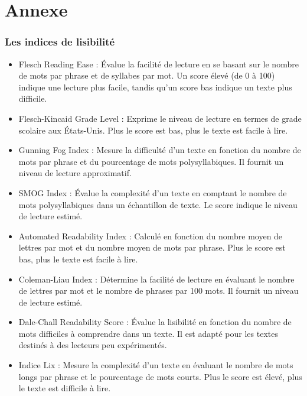 \documentclass[12pt,a4paper,oneside,titlepage]{book} %
\begin{document}
	
	\pagebreak


	\part{Annexe}
	\section*{Les indices de lisibilité}
\begin{itemize}
		
	\item Flesch Reading Ease : Évalue la facilité de lecture en se basant sur le nombre de mots par phrase et de syllabes par mot. Un score élevé (de 0 à 100) indique une lecture plus facile, tandis qu'un score bas indique un texte plus difficile.
	
	\item Flesch-Kincaid Grade Level : Exprime le niveau de lecture en termes de grade scolaire aux États-Unis. Plus le score est bas, plus le texte est facile à lire.
	
	\item Gunning Fog Index : Mesure la difficulté d'un texte en fonction du nombre de mots par phrase et du pourcentage de mots polysyllabiques. Il fournit un niveau de lecture approximatif.
	
	\item SMOG Index : Évalue la complexité d'un texte en comptant le nombre de mots polysyllabiques dans un échantillon de texte. Le score indique le niveau de lecture estimé.
	
	\item Automated Readability Index : Calculé en fonction du nombre moyen de lettres par mot et du nombre moyen de mots par phrase. Plus le score est bas, plus le texte est facile à lire.
	
	\item Coleman-Liau Index : Détermine la facilité de lecture en évaluant le nombre de lettres par mot et le nombre de phrases par 100 mots. Il fournit un niveau de lecture estimé.
	
	\item Dale-Chall Readability Score : Évalue la lisibilité en fonction du nombre de mots difficiles à comprendre dans un texte. Il est adapté pour les textes destinés à des lecteurs peu expérimentés.
	
	\item Indice Lix : Mesure la complexité d'un texte en évaluant le nombre de mots longs par phrase et le pourcentage de mots courts. Plus le score est élevé, plus le texte est difficile à lire.


\end{itemize}	
\end{document}
